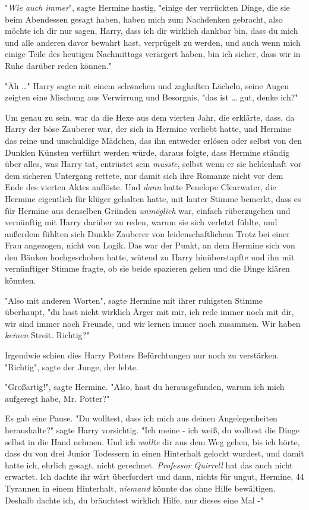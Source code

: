 {"\emph{Wie auch immer}", sagte Hermine hastig, "einige der verrückten Dinge, die sie beim Abendessen gesagt haben, haben mich zum Nachdenken gebracht, also möchte ich dir nur sagen, Harry, dass ich dir wirklich dankbar bin, dass du mich und alle anderen davor bewahrt hast, verprügelt zu werden, und auch wenn mich einige Teile des heutigen Nachmittags verärgert haben, bin ich sicher, dass wir in Ruhe darüber reden können."

"Äh …" Harry sagte mit einem schwachen und zaghaften Lächeln, seine Augen zeigten eine Mischung aus Verwirrung und Besorgnis, "das ist … gut, denke ich?"

Um genau zu sein, war da die Hexe aus dem vierten Jahr, die erklärte, dass, da Harry der böse Zauberer war, der sich in Hermine verliebt hatte, und Hermine das reine und unschuldige Mädchen, das ihn entweder erlösen oder selbst von den Dunklen Künsten verführt werden würde, daraus folgte, dass Hermine ständig über alles, was Harry tat, entrüstet sein \emph{musste}, selbst wenn er sie heldenhaft vor dem sicheren Untergang rettete, nur damit sich ihre Romanze nicht vor dem Ende des vierten Aktes auflöste. Und \emph{dann} hatte Penelope Clearwater, die Hermine eigentlich für klüger gehalten hatte, mit lauter Stimme bemerkt, dass es für Hermine aus denselben Gründen \emph{unmöglich} war, einfach rüberzugehen und vernünftig mit Harry darüber zu reden, warum sie sich verletzt fühlte, und außerdem fühlten sich Dunkle Zauberer von leidenschaftlichem Trotz bei einer Frau angezogen, nicht von Logik. Das war der Punkt, an dem Hermine sich von den Bänken hochgeschoben hatte, wütend zu Harry hinüberstapfte und ihn mit vernünftiger Stimme fragte, ob sie beide spazieren gehen und die Dinge klären könnten.

"Also mit anderen Worten", sagte Hermine mit ihrer ruhigsten Stimme überhaupt, "du hast nicht wirklich Ärger mit mir, ich rede immer noch mit dir, wir sind immer noch Freunde, und wir lernen immer noch zusammen. Wir haben \emph{keinen} Streit. Richtig?"

Irgendwie schien dies Harry Potters Befürchtungen nur noch zu verstärken. "Richtig", sagte der Junge, der lebte.

"Großartig!", sagte Hermine. "Also, hast du herausgefunden, warum ich mich aufgeregt habe, Mr. Potter?"

Es gab eine Pause. "Du wolltest, dass ich mich aus deinen Angelegenheiten heraushalte?" sagte Harry vorsichtig. "Ich meine - ich weiß, du wolltest die Dinge selbst in die Hand nehmen. Und ich \emph{wollte} dir aus dem Weg gehen, bis ich hörte, dass du von drei Junior Todessern in einen Hinterhalt gelockt wurdest, und damit hatte ich, ehrlich gesagt, nicht gerechnet. \emph{Professor Quirrell} hat das auch nicht erwartet. Ich dachte ihr wärt überfordert und dann, nichts für ungut, Hermine, 44 Tyrannen in einem Hinterhalt, \emph{niemand} könnte das ohne Hilfe bewältigen. Deshalb dachte ich, du bräuchtest wirklich Hilfe, nur dieses eine Mal -"

}
